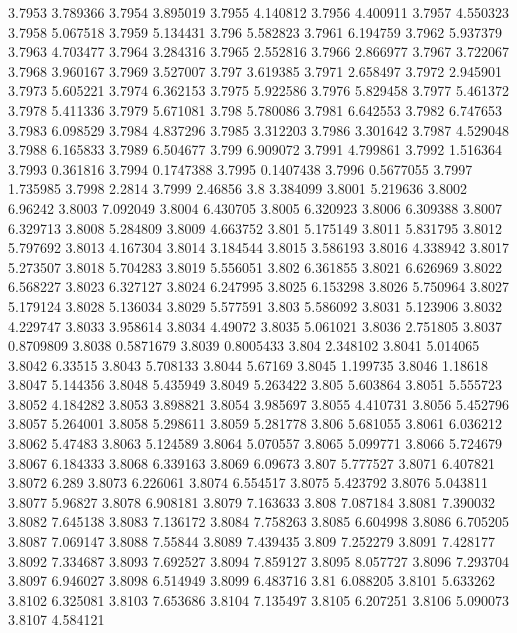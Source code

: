 3.7953  3.789366
3.7954  3.895019
3.7955  4.140812
3.7956  4.400911
3.7957  4.550323
3.7958  5.067518
3.7959  5.134431
3.796  5.582823
3.7961  6.194759
3.7962  5.937379
3.7963  4.703477
3.7964  3.284316
3.7965  2.552816
3.7966  2.866977
3.7967  3.722067
3.7968  3.960167
3.7969  3.527007
3.797  3.619385
3.7971  2.658497
3.7972  2.945901
3.7973  5.605221
3.7974  6.362153
3.7975  5.922586
3.7976  5.829458
3.7977  5.461372
3.7978  5.411336
3.7979  5.671081
3.798  5.780086
3.7981  6.642553
3.7982  6.747653
3.7983  6.098529
3.7984  4.837296
3.7985  3.312203
3.7986  3.301642
3.7987  4.529048
3.7988  6.165833
3.7989  6.504677
3.799  6.909072
3.7991  4.799861
3.7992  1.516364
3.7993  0.361816
3.7994  0.1747388
3.7995  0.1407438
3.7996  0.5677055
3.7997  1.735985
3.7998  2.2814
3.7999  2.46856
3.8  3.384099
3.8001  5.219636
3.8002  6.96242
3.8003  7.092049
3.8004  6.430705
3.8005  6.320923
3.8006  6.309388
3.8007  6.329713
3.8008  5.284809
3.8009  4.663752
3.801  5.175149
3.8011  5.831795
3.8012  5.797692
3.8013  4.167304
3.8014  3.184544
3.8015  3.586193
3.8016  4.338942
3.8017  5.273507
3.8018  5.704283
3.8019  5.556051
3.802  6.361855
3.8021  6.626969
3.8022  6.568227
3.8023  6.327127
3.8024  6.247995
3.8025  6.153298
3.8026  5.750964
3.8027  5.179124
3.8028  5.136034
3.8029  5.577591
3.803  5.586092
3.8031  5.123906
3.8032  4.229747
3.8033  3.958614
3.8034  4.49072
3.8035  5.061021
3.8036  2.751805
3.8037  0.8709809
3.8038  0.5871679
3.8039  0.8005433
3.804  2.348102
3.8041  5.014065
3.8042  6.33515
3.8043  5.708133
3.8044  5.67169
3.8045  1.199735
3.8046  1.18618
3.8047  5.144356
3.8048  5.435949
3.8049  5.263422
3.805  5.603864
3.8051  5.555723
3.8052  4.184282
3.8053  3.898821
3.8054  3.985697
3.8055  4.410731
3.8056  5.452796
3.8057  5.264001
3.8058  5.298611
3.8059  5.281778
3.806  5.681055
3.8061  6.036212
3.8062  5.47483
3.8063  5.124589
3.8064  5.070557
3.8065  5.099771
3.8066  5.724679
3.8067  6.184333
3.8068  6.339163
3.8069  6.09673
3.807  5.777527
3.8071  6.407821
3.8072  6.289
3.8073  6.226061
3.8074  6.554517
3.8075  5.423792
3.8076  5.043811
3.8077  5.96827
3.8078  6.908181
3.8079  7.163633
3.808  7.087184
3.8081  7.390032
3.8082  7.645138
3.8083  7.136172
3.8084  7.758263
3.8085  6.604998
3.8086  6.705205
3.8087  7.069147
3.8088  7.55844
3.8089  7.439435
3.809  7.252279
3.8091  7.428177
3.8092  7.334687
3.8093  7.692527
3.8094  7.859127
3.8095  8.057727
3.8096  7.293704
3.8097  6.946027
3.8098  6.514949
3.8099  6.483716
3.81  6.088205
3.8101  5.633262
3.8102  6.325081
3.8103  7.653686
3.8104  7.135497
3.8105  6.207251
3.8106  5.090073
3.8107  4.584121
